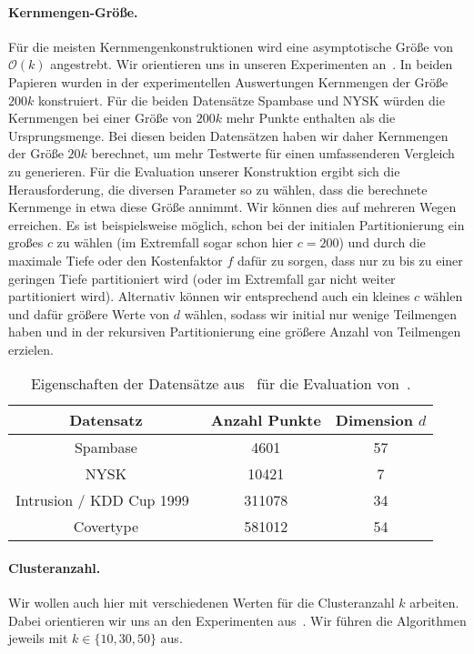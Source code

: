 \paragraph{Kernmengen-Größe.} Für die meisten Kernmengenkonstruktionen wird eine asymptotische Größe von $\mathcal{O}(k)$
angestrebt. Wir orientieren uns in unseren Experimenten an~\cite{AckermannMRSLS12,FichtenbergerGSSS13}. In beiden Papieren
wurden in der experimentellen Auswertungen Kernmengen der Größe $200k$ konstruiert. Für die beiden Datensätze Spambase und
NYSK würden die Kernmengen bei einer Größe von $200k$ mehr Punkte enthalten als die Ursprungsmenge. Bei diesen beiden Datensätzen
haben wir daher Kernmengen der Größe $20k$ berechnet, um mehr Testwerte für einen umfassenderen Vergleich zu generieren.
Für die Evaluation unserer Konstruktion
ergibt sich die Herausforderung, die diversen Parameter so zu wählen, dass die berechnete Kernmenge in etwa diese
Größe annimmt. Wir können dies auf mehreren Wegen erreichen. Es ist beispielsweise möglich, schon bei
der initialen Partitionierung ein großes $c$ zu wählen (im Extremfall sogar schon hier $c=200$) und durch die maximale Tiefe
oder den Kostenfaktor $f$ dafür zu sorgen, dass nur zu bis zu einer geringen Tiefe partitioniert wird (oder im Extremfall
gar nicht weiter partitioniert wird). Alternativ können wir entsprechend auch ein kleines $c$ wählen und dafür größere
Werte von $d$ wählen, sodass wir initial nur wenige Teilmengen haben und in der rekursiven Partitionierung eine größere
Anzahl von Teilmengen erzielen.

\begin{table}[t]
\centering
\begin{tabular}{@{}ccc@{}} \toprule
	\textbf{Datensatz} & \textbf{Anzahl Punkte} & \textbf{Dimension} $d$ \\ \midrule
	Spambase & 4601 & 57 \\
	NYSK & 10421  & 7 \\
	Intrusion / KDD Cup 1999~\cite{AckermannMRSLS12} & 311078 & 34 \\
	Covertype & 581012 & 54 \\ \bottomrule
\end{tabular}
\caption{Eigenschaften der Datensätze aus~\cite{Lichman13} für die Evaluation von~\CsTwo.}
\label{tbl:experiment-coresets-datasets}
\end{table}

\paragraph{Clusteranzahl.} Wir wollen auch hier mit verschiedenen Werten für die Clusteranzahl $k$ arbeiten.
Dabei orientieren wir uns an den Experimenten aus~\cite{AckermannMRSLS12,FichtenbergerGSSS13}. Wir führen die Algorithmen
jeweils mit $k \in \{ 10, 30, 50 \}$ aus.

